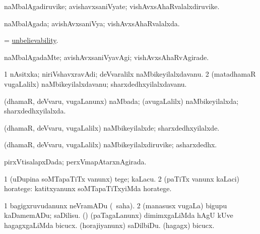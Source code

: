 \bentry
{} 
\gl{\nA}
\expl{}
\bmng
naMbalAgadiruvike; avishavxsaniVyate; vishAvxsAhaRvalalxdiruvike. 
\emng
\eentry

\bentry
{} 
\gl{\gu}
\expl{}
\bmng
naMbalAgada; avishAvxsaniVya; vishAvxsAhaRvalalxda. 
\emng
\eentry

\bentry
{} 
\gl{\nA}
\expl{}
\bmng
= \hyperlink{unbelievability}{unbelievability}. 
\emng
\eentry

\bentry
{} 
\gl{\kirxvi}
\expl{}
\bmng
naMbalAgadaMte; avishAvxsaniVyavAgi; vishAvxsAhaRvAgirade. 
\emng
\eentry

\bentry
{} 
\gl{\nA}
\expl{}
\bmng
\bnum
\num{1} nAsitxka; niriVshavxravAdi; deVvaralilx naMbikeyilalxdavanu. 
\num{2} (matadhamaR \mo vugaLalilx) naMbikeyilalxdavanu; sharxdedhxyilalxdavanu. 
\enum
\emng
\eentry

\bentry
{} 
\gl{\gu}
\expl{}
\bmng
(dhamaR, deVvaru, \mo vugaLanunx) naMbada; (avugaLalilx) naMbikeyilalxda; sharxdedhxyilalxda. 
\emng
\eentry

\bentry
{} 
\gl{\kirxvi}
\expl{}
\bmng
(dhamaR, deVvaru, \mo vugaLalilx) naMbikeyilalxde; sharxdedhxyilalxde. 
\emng
\eentry

\bentry
{} 
\gl{\nA}
\expl{}
\bmng
(dhamaR, deVvaru, \mo vugaLalilx) naMbikeyilalxdiruvike; asharxdedhx. 
\emng
\eentry

\bentry
{} 
\gl{\gu}
\expl{}
\bmng
pirxVtisalapxDada; perxVmapAtarxnAgirada. 
\emng
\eentry

\bentry
{} 
\gl{\sakirx}
\expl{}
\bmng
\bnum
\num{1} (uDupina soMTapaTiTx \mo vanunx) tege; kaLacu. 
\num{2} (paTiTx \mo vanunx kaLaci) horatege:  katitxyanunx soMTapaTiTxyiMda horatege. 
\enum
\emng
\eentry

\bentry
{} 
\gl{\kirx}


\noindent
\gl{\sakirx}
\expl{}
\bmng
\bnum
\num{1} bagigxruvudanunx neVramADu (\akirx\ saha). 
\num{2} (manasusx \mo vugaLa) bigupu kaDamemADu; saDilisu. 
 (\nw) 
\banum
{} (paTagaLanunx) dimimxgaLiMda hAgU kUve hagagxgaLiMda bicucx. 
 (horajiyanunx) saDilbiDu. 
 (hagagx) bicucx. 
\eanum
\numie
\enum
\emng

